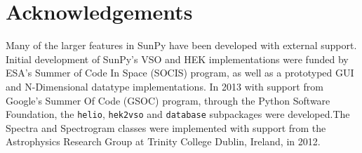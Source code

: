 \section{Acknowledgements}
Many of the larger features in SunPy have been developed with external support. 
Initial development of SunPy's VSO and HEK implementations were funded by ESA's 
Summer of Code In Space (SOCIS) program, as well as a prototyped GUI and 
N-Dimensional datatype implementations. In 2013 with support from Google's 
Summer Of Code (GSOC) program, through the Python Software Foundation, the 
\texttt{helio}, \texttt{hek2vso} and \texttt{database} subpackages were 
developed.The Spectra and Spectrogram classes were implemented with support 
from the Astrophysics Research Group at Trinity College Dublin, Ireland, in 
2012.